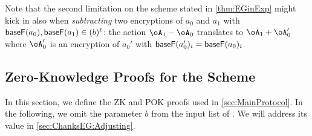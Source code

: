 Note that the second limitation on the scheme stated in \cref{thm:EGinExp} might kick in also when  \emph{subtracting}  two encryptions of  $a_0$ and $a_1$ with $\mathsf{baseF}(a_0),\mathsf{baseF}(a_1)\in (b)^\ell$: the action $\oA_1 - \oA_0$ translates to $\oA_1 + \oA_0'$ where $\oA_0'$ is an encryption of $a_0'$ with  $\mathsf{baseF}(a_0')_i = \mathsf{baseF}(a_0)_i$.

\subsection{Zero-Knowledge  Proofs for the Scheme }\label{sec:ChanksEG:Proofs}
In this section, we define the ZK and POK proofs used in  \cref{sec:MainProtocol}.
In the following, we omit the parameter $b$ from the input list of  \Dec.  We will address its value in \cref{sec:ChanksEG:Adjusting}.


